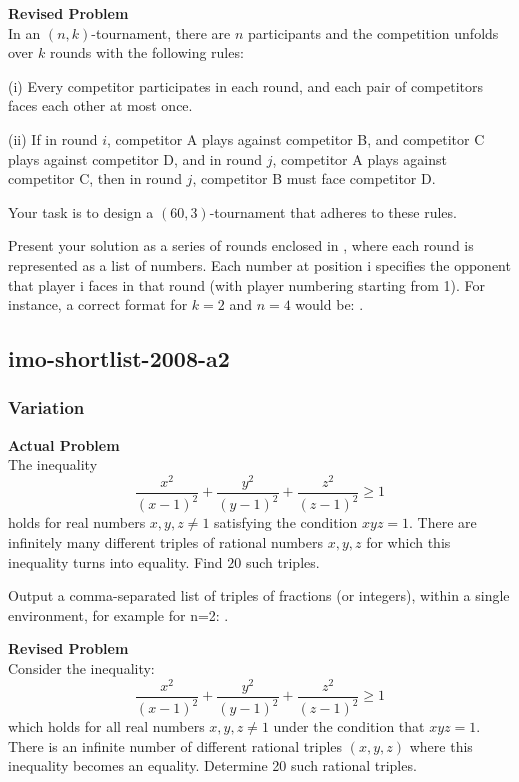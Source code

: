\textbf{Revised Problem}\\
In an $(n, k)$-tournament, there are $n$ participants and the competition unfolds over $k$ rounds with the following rules:

(i) Every competitor participates in each round, and each pair of competitors faces each other at most once.

(ii) If in round $i$, competitor A plays against competitor B, and competitor C plays against competitor D, and in round $j$, competitor A plays against competitor C, then in round $j$, competitor B must face competitor D.

Your task is to design a $(60, 3)$-tournament that adheres to these rules.

Present your solution as a series of rounds enclosed in \boxed, where each round is represented as a list of numbers. Each number at position i specifies the opponent that player i faces in that round (with player numbering starting from 1). For instance, a correct format for $k = 2$ and $n = 4$ would be: .

\subsection{imo-shortlist-2008-a2}
\subsubsection{Variation}
\textbf{Actual Problem}\\
The inequality
$$
\frac{x^2}{(x-1)^2} + \frac{y^2}{(y-1)^2} + \frac{z^2}{(z-1)^2} \geq 1
$$
holds for real numbers $x, y, z \neq 1$ satisfying the condition $xyz = 1$.
There are infinitely many different triples of rational numbers $x, y, z$ for which this inequality turns into equality.
Find $20$ such triples.


Output a comma-separated list of triples of fractions (or integers), within a single \boxed environment, for example for n=2: .

\textbf{Revised Problem}\\
Consider the inequality:
$$
\frac{x^2}{(x-1)^2} + \frac{y^2}{(y-1)^2} + \frac{z^2}{(z-1)^2} \geq 1
$$
which holds for all real numbers \(x, y, z \neq 1\) under the condition that \(xyz = 1\).
There is an infinite number of different rational triples \((x, y, z)\) where this inequality becomes an equality.
Determine 20 such rational triples.

